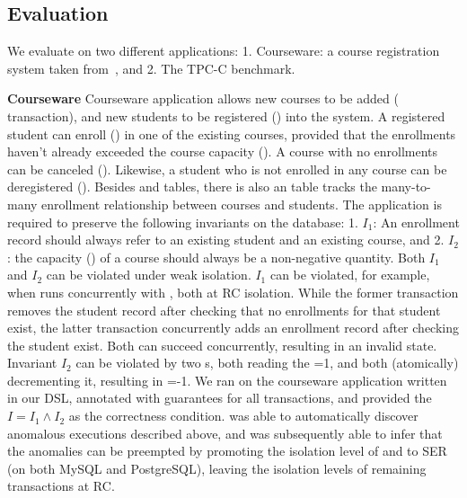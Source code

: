 \subsection{Evaluation}

We evaluate \tool on two different applications: 1. Courseware: a
course registration system taken from~\cite{gotsmanpopl16}, and
2. The TPC-C benchmark. 

\textbf{Courseware} Courseware application allows new courses to be
added ( transaction), and new students to be
registered () into the system. A registered
student can enroll () in one of the existing courses,
provided that the enrollments haven't already exceeded the course
capacity (). A course with no enrollments can be
canceled (). Likewise, a student who is not enrolled
in any course can be deregistered (). Besides
 and  tables, there is also an 
table tracks the many-to-many enrollment relationship between courses
and students. The application is required to preserve the following
invariants on the database: 1.  $I_1$: An enrollment record should
always refer to an existing student and an existing course, and 2.
$I_2$: the capacity () of a course should always be a
non-negative quantity. Both $I_1$ and $I_2$ can be violated under weak
isolation. $I_1$ can be violated, for example, when
 runs concurrently with , both at RC
isolation. While the former transaction removes the student record
after checking that no enrollments for that student exist, the latter
transaction concurrently adds an enrollment record after checking the
student exist. Both can succeed concurrently, resulting in an invalid
state. Invariant $I_2$ can be violated by two s, both
reading the =1, and both (atomically) decrementing it,
resulting in =-1.  We ran \tool on the courseware
application written in our DSL, annotated with guarantees for all
transactions, and provided the $I = I_1 \wedge I_2$ as the correctness
condition. \tool was able to automatically discover anomalous
executions described above, and was subsequently able to infer that
the anomalies can be preempted by promoting the isolation level of
 and  to SER (on both MySQL and
PostgreSQL), leaving the isolation levels of remaining transactions at
RC.

